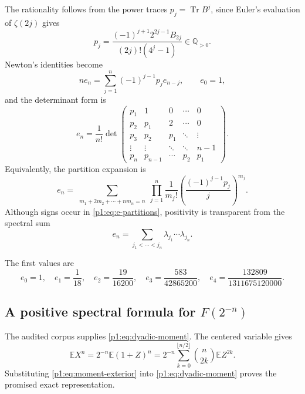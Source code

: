 \documentclass[11pt,oneside]{article}
\theoremstyle{definition}
\newcommand{\E}{\mathbb E}
\newcommand{\Tr}{\operatorname{Tr}}
\begin{document}
The rationality follows from the power traces
\(p_j=\Tr B^j\), since Euler's evaluation of \(\zeta(2j)\) gives
\begin{equation}
 p_j=\frac{(-1)^{j+1}2^{2j-1}B_{2j}}
 {(2j)!(4^j-1)}\in\mathbb Q_{>0}.
 \label{p1:eq:p-Bernoulli}
\end{equation}
Newton's identities become
\begin{equation}
 ne_n=\sum_{j=1}^{n}(-1)^{j-1}p_j e_{n-j},
 \qquad e_0=1,
 \label{p1:eq:Newton-e}
\end{equation}
and the determinant form is
\begin{equation}
 e_n=\frac1{n!}
 \det\begin{pmatrix}
 p_1&1&0&\cdots&0\\
 p_2&p_1&2&\cdots&0\\
 p_3&p_2&p_1&\ddots&\vdots\\
 \vdots&\vdots&\ddots&\ddots&n-1\\
 p_n&p_{n-1}&\cdots&p_2&p_1
 \end{pmatrix}.
 \label{p1:eq:e-determinant}
\end{equation}
Equivalently, the partition expansion is
\begin{equation}
 e_n=\sum_{\substack{m_1+2m_2+\cdots+nm_n=n}}
 \prod_{j=1}^{n}
 \frac1{m_j!}\left(\frac{(-1)^{j-1}p_j}{j}\right)^{m_j}.
 \label{p1:eq:e-partitions}
\end{equation}
Although signs occur in \eqref{p1:eq:e-partitions}, positivity is transparent from the
spectral sum
\begin{equation}
 e_n=\sum_{j_1<\cdots<j_n}\lambda_{j_1}\cdots\lambda_{j_n}.
 \label{p1:eq:e-spectral-sum}
\end{equation}

The first values are
\begin{equation}
 e_0=1,
 \quad e_1=\frac1{18},
 \quad e_2=\frac{19}{16200},
 \quad e_3=\frac{583}{42865200},
 \quad e_4=\frac{132809}{1311675120000}.
 \label{p1:eq:first-e}
\end{equation}

\subsection{A positive spectral formula for \(F(2^{-n})\)}

The audited corpus supplies \eqref{p1:eq:dyadic-moment}.  The centered variable gives
\begin{equation}
 \E X^n=2^{-n}\E(1+Z)^n
 =2^{-n}\sum_{k=0}^{\lfloor n/2\rfloor}
 \binom n{2k}\E Z^{2k}.
 \label{p1:eq:X-centered-moment}
\end{equation}
Substituting \eqref{p1:eq:moment-exterior} into
\eqref{p1:eq:dyadic-moment} proves the promised exact representation.
\end{document}
